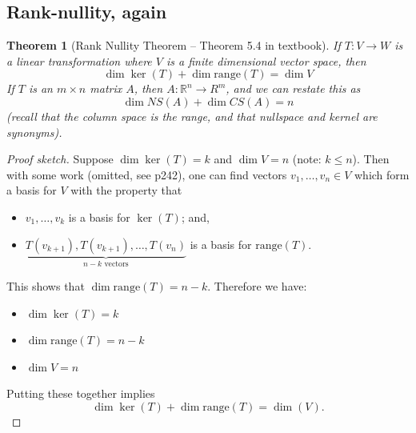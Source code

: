 \documentclass[10pt]{article}
\newtheorem{theorem}{Theorem}
\theoremstyle{definition}
\newcommand{\R}{\mathbb{R}}           %
\newcommand{\range}{\mathrm{range}} %
\begin{document}
\subsection{Rank-nullity, again}
\begin{theorem}[Rank Nullity Theorem -- Theorem 5.4 in textbook]
  \label{thm:rank-nullity-theorem-theorem-5.4-textbook}
  If $T:V \to W$ is a linear transformation where $V$ is a finite dimensional
  vector space, then
  \begin{equation*}
    \dim \ker(T) + \dim \range(T) = \dim V
  \end{equation*}
  If $T$ is an $m\times n$ matrix $A$, then $A:\R^{n}\to R^{m}$, and we can
  restate this as
  \begin{equation}\label{eq:6}
    \dim NS(A) + \dim CS(A) = n
  \end{equation}
  (recall that the column space is the range, and that nullspace and kernel
  are synonyms).
\end{theorem}
\begin{proof}[Proof sketch]
  Suppose $\dim \ker(T)=k$ and $\dim V =n$ (note: $k \leq n$). Then with some
  work (omitted, see p242), one can find vectors $v_{1},\ldots, v_{n}\in V$ which form a
  basis for $V$ with the property that
  \begin{itemize}
    \item $v_{1},\ldots,v_{k}$ is a basis for $\ker(T)$; and,
    \item
    $\underbrace{T(v_{k+1}),T(v_{k+1}),\ldots, T(v_{n})}_{n-k\text{ vectors}}$
    is a basis for $\range(T)$.
  \end{itemize}
  This shows that $\dim \range(T) = n-k$. Therefore we have:
  \begin{itemize}
    \item $\dim \ker(T)=k$
    \item $\dim \range(T) = n-k$ 
    \item $\dim V =n$
  \end{itemize}
  Putting these together implies
  \begin{equation*}
    \dim \ker(T) + \dim \range(T) = \dim(V). 
  \end{equation*}
\end{proof}
\end{document}

